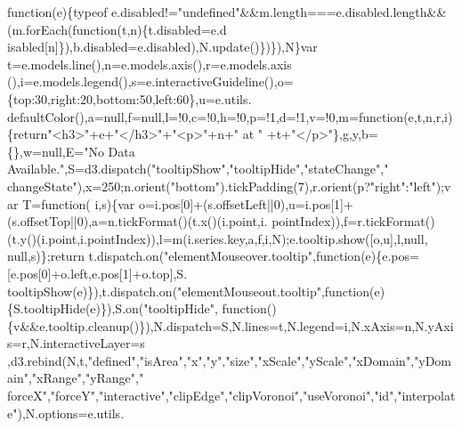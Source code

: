 \begin{DoxyCode}
{{      function}(e)\{typeof e.disabled!=\textcolor{stringliteral}{"undefined"}&&m.length===e.disabled.length&&(m.forEach(function(t,n)\{t.disabled=e.d
      isabled[n]\}),b.disabled=e.disabled),N.update()\})\}),N\}var t=e.models.line(),n=e.models.axis(),r=e.models.axis
      (),i=e.models.legend(),s=e.interactiveGuideline(),o=\{top:30,right:20,bottom:50,left:60\},u=e.utils.
      defaultColor(),a=null,f=null,l=!0,c=!0,h=!0,p=!1,d=!1,v=!0,m=\textcolor{keyword}{function}(e,t,n,r,i)\{\textcolor{keywordflow}{return}\textcolor{stringliteral}{"<h3>"}+e+\textcolor{stringliteral}{"</h3>"}+\textcolor{stringliteral}{"<p>"}+n+\textcolor{stringliteral}{" at "}
      +t+\textcolor{stringliteral}{"</p>"}\},g,y,b=\{\},w=null,E=\textcolor{stringliteral}{"No Data Available."},S=d3.dispatch(\textcolor{stringliteral}{"tooltipShow"},\textcolor{stringliteral}{"tooltipHide"},\textcolor{stringliteral}{"stateChange"},\textcolor{stringliteral}{"
      changeState"}),x=250;n.orient(\textcolor{stringliteral}{"bottom"}).tickPadding(7),r.orient(p?\textcolor{stringliteral}{"right"}:\textcolor{stringliteral}{"left"});var T=\textcolor{keyword}{function}(
      i,s)\{var o=i.pos[0]+(s.offsetLeft||0),u=i.pos[1]+(s.offsetTop||0),a=n.tickFormat()(t.x()(i.point,i.
      pointIndex)),f=r.tickFormat()(t.y()(i.point,i.pointIndex)),l=m(i.series.key,a,f,i,N);e.tooltip.show([o,u],l,null,
      null,s)\};\textcolor{keywordflow}{return} t.dispatch.on(\textcolor{stringliteral}{"elementMouseover.tooltip"},\textcolor{keyword}{function}(e)\{e.pos=[e.pos[0]+o.left,e.pos[1]+o.top],S.
      tooltipShow(e)\}),t.dispatch.on(\textcolor{stringliteral}{"elementMouseout.tooltip"},\textcolor{keyword}{function}(e)\{S.tooltipHide(e)\}),S.on(\textcolor{stringliteral}{"tooltipHide"},\textcolor{keyword}{
      function}()\{v&&e.tooltip.cleanup()\}),N.dispatch=S,N.lines=t,N.legend=i,N.xAxis=n,N.yAxis=r,N.interactiveLayer=s
      ,d3.rebind(N,t,\textcolor{stringliteral}{"defined"},\textcolor{stringliteral}{"isArea"},\textcolor{stringliteral}{"x"},\textcolor{stringliteral}{"y"},\textcolor{stringliteral}{"size"},\textcolor{stringliteral}{"xScale"},\textcolor{stringliteral}{"yScale"},\textcolor{stringliteral}{"xDomain"},\textcolor{stringliteral}{"yDomain"},\textcolor{stringliteral}{"xRange"},\textcolor{stringliteral}{"yRange"},\textcolor{stringliteral}{"
      forceX"},\textcolor{stringliteral}{"forceY"},\textcolor{stringliteral}{"interactive"},\textcolor{stringliteral}{"clipEdge"},\textcolor{stringliteral}{"clipVoronoi"},\textcolor{stringliteral}{"useVoronoi"},\textcolor{stringliteral}{"id"},\textcolor{stringliteral}{"interpolate"}),N.options=e.utils.
}
\end{DoxyCode}
